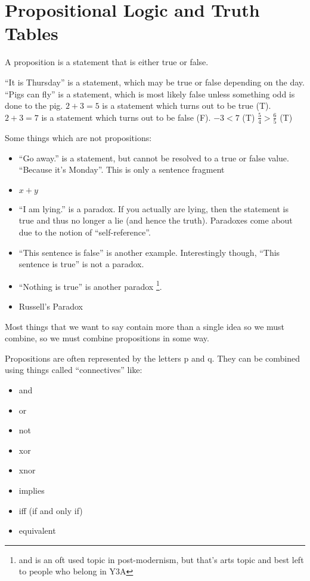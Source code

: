 \section{Propositional Logic and Truth Tables}
\label{sec:PropositionalLogicAndTruthTables}

A proposition is a statement that is either true or false.

``It is Thursday'' is a statement, which may be true or false depending on the
day.
``Pigs can fly'' is a statement, which is most likely false unless something odd
is done to the pig.
$2 + 3 = 5$ is a statement which turns out to be true (T).
$2 + 3 = 7$ is a statement which turns out to be false (F).
$ -3 < 7  $ (T)
$\frac{5}{4} > \frac{6}{5}$ (T)

Some things which are not propositions:
\begin{itemize}
  \item ``Go away.'' is a statement, but cannot be resolved to a true or false
  value. ``Because it's Monday''. This is only a sentence fragment 
  \item $ x + y $
  \item ``I am lying.'' is a paradox. If you actually are lying, then the
  statement is true and thus no longer a lie (and hence the truth). Paradoxes come about due to
the notion of ``self-reference''.
  \item ``This sentence is false'' is another example. Interestingly though,
  ``This sentence is true'' is not a paradox.
  \item ``Nothing is true'' is another paradox \footnote{and is an oft used
  topic in post-modernism, but that's arts topic and best left to people who
  belong in Y3A}.
  \item Russell's Paradox
\end{itemize}

Most things that we want to say contain more than a single idea so we must
combine, so we must combine propositions in some way.

Propositions are often represented by the letters p and q. They can be combined
using things called ``connectives'' like:
\begin{itemize}
  \item and
  \item or
  \item not
  \item xor
  \item xnor
  \item implies
  \item iff (if and only if)
  \item equivalent
\end{itemize}

